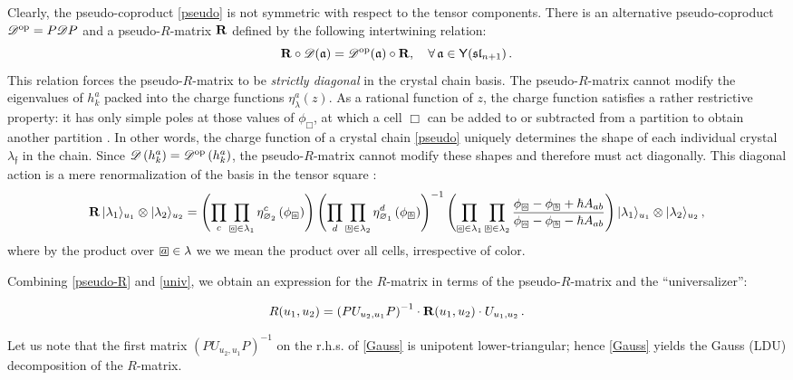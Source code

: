 \documentclass[10pt]{article}
\theoremstyle{definition}
\def\fa{\mathfrak{a}}
\def\ff{\mathfrak{f}}
\def\fl{\mathfrak{l}}
\def\fs{\mathfrak{s}}
\def\fs{\mathfrak{s}}
\def\myY{{\mathsf{Y}}}
\def\sD{{\mathscr{D}}}
\def\lm{\limits}
\numberwithin{equation}{section}
\newcommand\sqbox[1]{{
		\setbox0=\hbox{\mbox{$\Box$}}
		\setbox1=\hbox{\mbox{\raisebox{0.35ex}{\small #1}}}
		\mbox{\raisebox{-0.2ex}{\rlap{\hbox to \wd0{\hss{\box1}\hss}}\box0}}
}}
\newcommand\ssqbox[1]{{
		\setbox0=\hbox{\mbox{$\scriptstyle\Box$}}
		\setbox1=\hbox{\mbox{\raisebox{0.35ex}{\tiny #1}}}
		\mbox{\raisebox{-0.2ex}{\rlap{\hbox to \wd0{\hss{\box1}\hss}}\box0}}
}}
\begin{document}
Clearly, the pseudo-coproduct \eqref{pseudo} is not symmetric with respect to the tensor components.
There is an alternative pseudo-coproduct $\sD^{\rm op}=P\sD P$ and a pseudo-$R$-matrix $\bf R$ defined by the following intertwining relation:
\begin{equation}\label{pseudo-R}
	{\bf R}\circ\sD(\fa)=\sD^{\rm op}(\fa)\circ {\bf R},\quad \forall\,\fa\in\myY(\fs\fl_{n+1})\,.
\end{equation}
This relation forces the pseudo-$R$-matrix to be \emph{strictly diagonal} in the crystal chain basis.
The pseudo-$R$-matrix cannot modify the eigenvalues of $h_k^a$ packed into the charge functions $\eta_{\lambda}^a(z)$.
As a rational function of $z$,  the charge function satisfies a rather restrictive property: it has only simple poles at those values of $\phi_{\Box}$, at which a cell $\Box$ can be added to or subtracted from a partition to obtain another partition \cite{Li:2020rij}.
In other words, the charge function of a crystal chain \eqref{pseudo}  uniquely determines the shape of each individual crystal $\lambda_{\ff}$ in the chain.
Since $\sD\left(h_k^a\right)=\sD^{\rm op}\left(h_k^a\right)$, the pseudo-$R$-matrix cannot modify these shapes and therefore must act diagonally.
This diagonal action is a mere renormalization of the basis in the tensor square \cite{Galakhov:2022uyu}:
\begin{equation}\label{diag_R}
	{\bf R}\,|\lambda_1\rangle_{u_1}\otimes|\lambda_2\rangle_{u_2}=\left(\prod\lm_c\prod_{\ssqbox{$a$}\in\lambda_1}\eta^c_{\varnothing_2}\left(\phi_{\ssqbox{$a$}}\right)\right)\left(\prod\lm_d\prod_{\ssqbox{$b$}\in\lambda_2}\eta^d_{\varnothing_1}\left(\phi_{\ssqbox{$b$}}\right)\right)^{-1}\left(\prod\lm_{\ssqbox{$a$}\in\lambda_1}\prod\lm_{\ssqbox{$b$}\in\lambda_2}\frac{\phi_{\ssqbox{$a$}}-\phi_{\ssqbox{$b$}}+\hbar A_{ab}}{\phi_{\ssqbox{$a$}}-\phi_{\ssqbox{$b$}}-\hbar A_{ab}}\right)|\lambda_1\rangle_{u_1}\otimes|\lambda_2\rangle_{u_2}\,,
\end{equation}
where by the product over $\sqbox{$a$}\in\lambda$ we we mean the product over all cells, irrespective of color.

Combining \eqref{pseudo-R} and \eqref{univ}, we obtain an expression for the $R$-matrix in terms of the pseudo-$R$-matrix and the ``universalizer'':
\begin{tcolorbox}
\begin{equation}\label{Gauss}
	R(u_1,u_2)=\left(P U_{u_2,u_1}P\right)^{-1}\cdot{\bf R}(u_1,u_2)\cdot U_{u_1,u_2}\,.
\end{equation}
\end{tcolorbox}
\noindent Let us note that the first matrix $\left(P U_{u_2,u_1}P\right)^{-1}$ on the r.h.s. of \eqref{Gauss} is unipotent lower-triangular; hence \eqref{Gauss} yields the Gauss (LDU) decomposition of the $R$-matrix.
\end{document}
